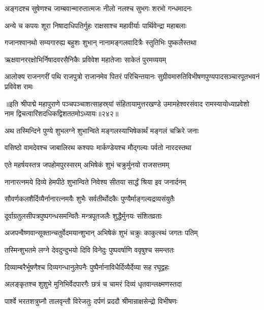 \twolineshloka
{अङ्गदश्च सुषेणश्च जाम्बवान्मारुतात्मजः}
{नीलो नलश्च सुभगः शरभो गन्धमादनः}%

\twolineshloka
{अन्ये च कपयः शूरा निषादाधिपतिर्गुहः}
{राक्षसाश्च महावीर्याः पार्थिवेन्द्रा महाबलाः}%

\twolineshloka
{गजानश्वानथो सम्यगारुह्य बहुशः शुभान्}
{नानामङ्गलवादित्रैः स्तुतिभिः पुष्कलैस्तथा}%

\twolineshloka
{ऋक्षवानररक्षोभिर्निषादवरसैनिकैः}
{प्रविवेश महातेजाः साकेतं पुरमव्ययम्}%

\twolineshloka
{आलोक्य राजनगरीं पथि राजपुत्रो राजानमेव पितरं परिचिन्तयानः}
{सुग्रीवमारुतिविभीषणपुण्यपादसञ्चारपूतभवनं प्रविवेश रामः}%

॥इति श्रीपाद्मे महापुराणे पञ्चपञ्चाशत्साहस्र्यां संहितायामुत्तरखण्डे उमामहेश्वरसंवाद रामस्यायोध्याप्रवेशो नाम द्विचत्वारिंशदधिकद्विशततमोऽध्यायः॥२४२॥



\twolineshloka
{अथ तस्मिन्दिने पुण्ये शुभलग्ने शुभान्विते}
{मङ्गलस्याभिषेकार्थं मङ्गलं चक्रिरे जनाः}%

\twolineshloka
{वसिष्ठो वामदेवश्च जाबालिरथ कश्यपः}
{मार्कण्डेयश्च मौद्गल्यः पर्वतो नारदस्तथा}%

\twolineshloka
{एते महर्षयस्तत्र जपहोमपुरस्सरम्}
{अभिषेकं शुभं चक्रुर्मुनयो राजसत्तमम्}%

\twolineshloka
{नानारत्नमये दिव्ये हेमपीठे शुभान्विते}
{निवेश्य सीतया सार्द्धं श्रिया इव जनार्दनम्}%

\twolineshloka
{सौवर्णकलशैर्दिव्यैर्नानारत्नमयैः शुभैः}
{सर्वतीर्थोदकैः पुण्यैर्माङ्गल्यद्रव्यसंयुतैः}%

\twolineshloka
{दूर्वाग्रतुलसीपत्रपुष्पगन्धसमन्वितैः}
{मन्त्रपूतजलैः शुद्धैर्मुनयः संशितव्रताः}%

\twolineshloka
{अजपन्वैष्णवान्सूक्तान्चतुर्वेदमयान्शुभान्}
{अभिषेकं शुभं चक्रुः काकुत्स्थं जगतः पतिम्}%

\twolineshloka
{तस्मिन्शुभतमे लग्ने देवदुन्दुभयो दिवि}
{विनेदुः पुष्पवर्षाणि ववृषुश्च समन्ततः}%

\twolineshloka
{दिव्याम्बरैर्भूषणैश्च दिव्यगन्धानुलेपनैः}
{पुष्पैर्नानाविधैर्दिव्यैर्देव्या सह रघूद्वहः}%

\twolineshloka
{अलङ्कृतश्च शुशुभे मुनिभिर्वेदपारगैः}
{छत्रं च चामरं दिव्यं धृतवान्लक्ष्मणस्तदा}%

\twolineshloka
{पार्श्वे भरतशत्रुघ्नौ तालवृन्तौ विरेजतुः}
{दर्पणं प्रददौ श्रीमान्राक्षसेन्द्रो विभीषणः}%


